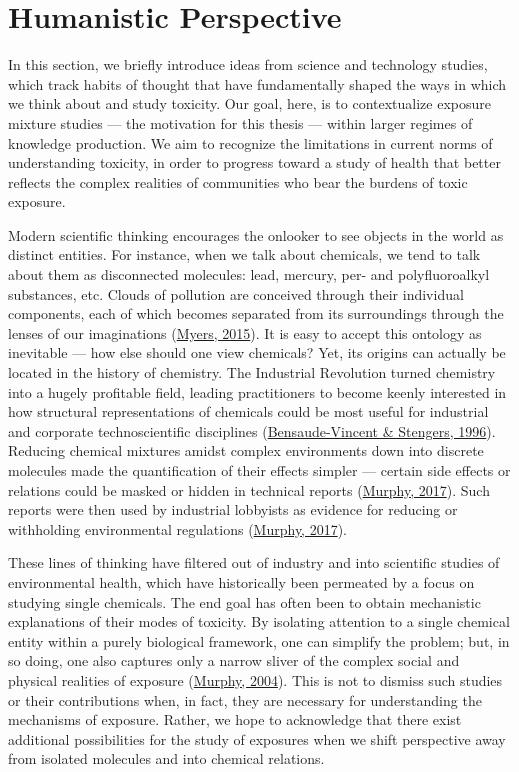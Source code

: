 \documentclass[12pt, twoside]{amherstthesis}
\begin{document}
\hypertarget{humanistic}{%
\chapter{Humanistic Perspective}\label{humanistic}}

In this section, we briefly introduce ideas from science and technology studies, which track habits of thought that have fundamentally shaped the ways in which we think about and study toxicity. Our goal, here, is to contextualize exposure mixture studies --- the motivation for this thesis --- within larger regimes of knowledge production. We aim to recognize the limitations in current norms of understanding toxicity, in order to progress toward a study of health that better reflects the complex realities of communities who bear the burdens of toxic exposure.

Modern scientific thinking encourages the onlooker to see objects in the world as distinct entities. For instance, when we talk about chemicals, we tend to talk about them as disconnected molecules: lead, mercury, per- and polyfluoroalkyl substances, etc. Clouds of pollution are conceived through their individual components, each of which becomes separated from its surroundings through the lenses of our imaginations (\protect\hyperlink{ref-myers_rendering_2015}{Myers, 2015}). It is easy to accept this ontology as inevitable --- how else should one view chemicals? Yet, its origins can actually be located in the history of chemistry. The Industrial Revolution turned chemistry into a hugely profitable field, leading practitioners to become keenly interested in how structural representations of chemicals could be most useful for industrial and corporate technoscientific disciplines (\protect\hyperlink{ref-bensaude-vincent_history_1996}{Bensaude-Vincent \& Stengers, 1996}). Reducing chemical mixtures amidst complex environments down into discrete molecules made the quantification of their effects simpler --- certain side effects or relations could be masked or hidden in technical reports (\protect\hyperlink{ref-murphy_alterlife_2017}{Murphy, 2017}). Such reports were then used by industrial lobbyists as evidence for reducing or withholding environmental regulations (\protect\hyperlink{ref-murphy_alterlife_2017}{Murphy, 2017}).

These lines of thinking have filtered out of industry and into scientific studies of environmental health, which have historically been permeated by a focus on studying single chemicals. The end goal has often been to obtain mechanistic explanations of their modes of toxicity. By isolating attention to a single chemical entity within a purely biological framework, one can simplify the problem; but, in so doing, one also captures only a narrow sliver of the complex social and physical realities of exposure (\protect\hyperlink{ref-murphy_uncertain_2004}{Murphy, 2004}). This is not to dismiss such studies or their contributions when, in fact, they are necessary for understanding the mechanisms of exposure. Rather, we hope to acknowledge that there exist additional possibilities for the study of exposures when we shift perspective away from isolated molecules and into chemical relations.
\end{document}
